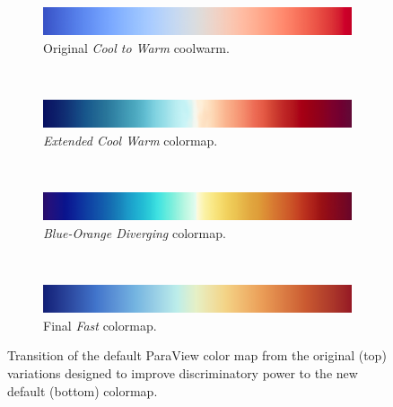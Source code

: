 \documentclass{IEEEcsmag}
\newcommand*{\colormap}[1]{\textsl{#1}\xspace}
\newcommand*{\coolwarm}{\colormap{Cool to Warm}}
\newcommand*{\blueorange}{\colormap{Blue-Orange Diverging}}
\newcommand*{\fast}{\colormap{Fast}}
\newcommand*{\extendedcoolwarm}{\colormap{Extended Cool Warm}}
\begin{document}
\begin{figure}[t]
  \begin{subfigure}{\linewidth}
    \includegraphics[width=\linewidth]{map-cool-to-warm}
    \vspace{-1.4\baselineskip}
    \caption{Original \coolwarm coolwarm.}
    \label{fig:design:coolwarm}
  \end{subfigure}\\[4pt]
  \begin{subfigure}{\linewidth}
    \includegraphics[width=\linewidth]{Final_Pics/CW_extended.png}
    \vspace{-1.4\baselineskip}
    \caption{\extendedcoolwarm colormap.}
    \label{fig:design:cw est}
  \end{subfigure}\\[4pt]
  \begin{subfigure}{\linewidth}
    \includegraphics[width=\linewidth]{map-blue-orange-diverging}
    \vspace{-1.4\baselineskip}
    \caption{\blueorange colormap.}
    \label{fig:design:blueorange}
  \end{subfigure}\\[4pt]
  \begin{subfigure}{\linewidth}
    \includegraphics[width=\linewidth]{map-fast}
    \vspace{-1.4\baselineskip}
    \caption{Final \fast colormap.}
    \label{fig:design:fast}
  \end{subfigure}
  \caption{
    Transition of the default ParaView color map from the original (top) variations designed to improve discriminatory power to the new default (bottom) colormap.
  }
  \label{fig:designs}
\end{figure}
\end{document}
